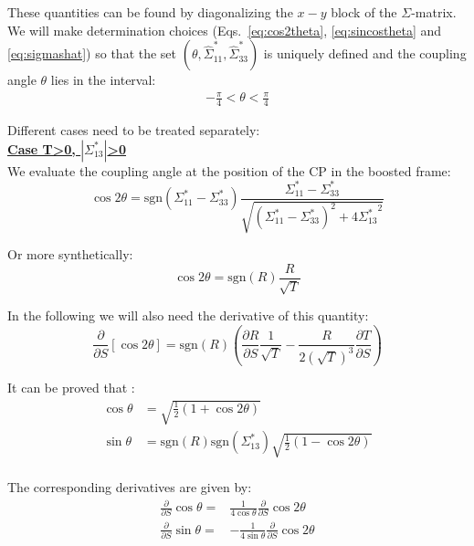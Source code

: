 These quantities can be found by diagonalizing the $x-y$ block of the $\Sigma$-matrix.
We will make determination choices (Eqs.~\ref{eq:cos2theta}, \ref{eq:sincostheta} and \ref{eq:sigmashat}) so that the set $(\theta, \hat{\Sigma}^*_{11}, \hat{\Sigma}^*_{33})$ is uniquely defined and the coupling angle $\theta$ lies in the interval:
\begin{align}
-\frac{\pi}{4}<\theta<\frac{\pi}{4}
\end{align}

Different cases need to be treated separately:
~\\

\textbf{\underline{Case T>0, $\left|\Sigma^*_{13}\right|$>0}}
~\\

We evaluate the coupling angle at the position of the CP in the boosted frame:
\begin{equation}
\cos 2\theta = \textrm{sgn} \left(\Sigma^*_{11} - \Sigma^*_{33}\right)\frac{\Sigma^*_{11} - \Sigma^*_{33}}{\sqrt{\left(\Sigma^*_{11} - \Sigma^*_{33}\right)^2 + 4 {\Sigma^*_{13}}^2 }}
\end{equation}

Or more synthetically:
\begin{equation}
\cos 2\theta = \textrm{sgn}(R)\frac{R}{\sqrt{T}}
\label{eq:cos2theta}
\end{equation}

In the following we will also need the derivative of this quantity:
\begin{equation}
\frac{\partial }{\partial S} \left[ \cos 2\theta \right] =  \textrm{sgn}(R)
\left(\frac{\partial R}{\partial S} \frac{1}{\sqrt{T}}-\frac{R}{2\left( \sqrt{T}\right)^3}\frac{\partial T}{\partial S}\right)
\end{equation}

It can be proved that \cite{beam_beam}:
\begin{align}
\cos \theta &= \sqrt{\frac{1}{2}\left(1 + \cos 2\theta \right)}\\
\sin \theta &= \textrm{sgn}(R)\textrm{sgn}(\Sigma^*_{13}) \sqrt{\frac{1}{2}\left(1 - \cos 2\theta \right)}
\label{eq:sincostheta}
\end{align}
~\\

The corresponding derivatives are given by:
\begin{align}
\frac{\partial }{\partial S} \cos \theta =& \frac{1}{4 \cos \theta} \frac{\partial }{\partial S} \cos 2\theta \\
\frac{\partial }{\partial S} \sin \theta =& -\frac{1}{4 \sin \theta} \frac{\partial }{\partial S} \cos 2\theta \label{eq:dS_sintheta}
\end{align}

